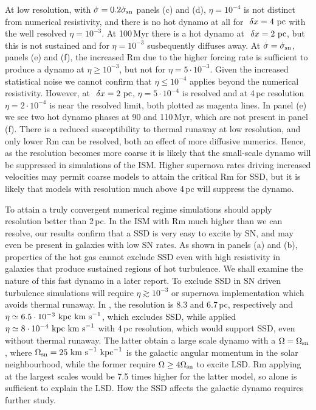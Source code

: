 \documentclass[preprint2]{aastex63}
\newcommand\SNr{\dot\sigma_{\rm sn}}
\newcommand\OSN{\Omega_{\rm sn}}
\newcommand\kpc{~ {\rm kpc}}
\newcommand\pc{~ {\rm pc}}
\newcommand\dx{~ {\delta x}}
\newcommand\kms{~ {\rm km~ s}^{-1}}
\begin{document}
At low resolution, with $\dot\sigma=0.2\SNr$ panels (c) and (d), $\eta=10^{-4}$
is not distinct from numerical resistivity, and there is no hot dynamo at all
for $\dx=4\pc$ with the well resolved $\eta=10^{-3}$.
At 100\,Myr there is a hot dynamo at $\dx=2\pc$, but this is not
sustained and for $\eta=10^{-3}$ susbequently diffuses away.
At $\dot\sigma=\SNr$, panels (e) and (f), the increased Rm due to the 
higher forcing rate is sufficient to produce a dynamo at $\eta\geq10^{-3}$, but
not for $\eta=5\cdot10^{-3}$.
Given the increased statistical noise we cannot confirm that $\eta\leq10^{-4}$
applies beyond the numerical resistivity.
However, at $\dx=2\pc$, $\eta=5\cdot10^{-4}$ is resolved and at 4\,pc
resolution $\eta=2\cdot10^{-4}$ is near the resolved limit, both plotted as
magenta lines.
In panel (e) we see two hot dynamo phases at 90  and 110\,Myr, which are not 
present in panel (f).
There is a reduced susceptibility to thermal runaway at low resolution, 
and only lower Rm can be resolved, both an effect of more diffusive numerics.
Hence, as the resolution becomes more coarse it is likely that the small-scale 
dynamo will be suppressed in simulations of the ISM.
Higher supernova rates driving increased velocities may permit coarse models 
to attain the critical Rm for SSD, but it is likely that models with 
resolution much above 4\,pc will suppress the dynamo. 

To attain a truly convergent numerical regime simulations should apply 
resolution better than 2\,pc.
In the ISM with Rm much higher than we can resolve, our results confirm that a
SSD is very easy to excite by SN, and may even be present in galaxies with
low SN rates.
As shown in panels (a) and (b), properties of the hot gas cannot exclude 
SSD even with high resistivity in galaxies that produce sustained regions of
hot turbulence.
We shall examine the nature of this fast dynamo in a later report.
To exclude SSD in SN driven turbulence simulations will require
$\eta\gtrsim10^{-3}$ or supernova implementation which avoids thermal runaway.
In \citet{Gressel:2008,GE20}, the resolution is 8.3 and 6.7\,pc, respectively
and $\eta\simeq6.5\cdot10^{-3}\kpc\kms$, which excludes SSD,
while \citet{Gent:2013b} applied $\eta\simeq8\cdot10^{-4}\kpc\kms$ with 4\,pc
resolution, which would support SSD, even without thermal runaway.
The latter obtain a large scale dynamo with a $\Omega=\OSN$, where 
$\OSN=25\kms\kpc^{-1}$ is the galactic angular momentum in the solar
neighbourhood, while the
former require $\Omega\geq4\OSN$ to excite LSD.
Rm applying at the largest scales would be 7.5 times higher for the latter 
model, so alone is sufficient to explain the LSD.
How the SSD affects the galactic dynamo requires further study. 
\end{document}
